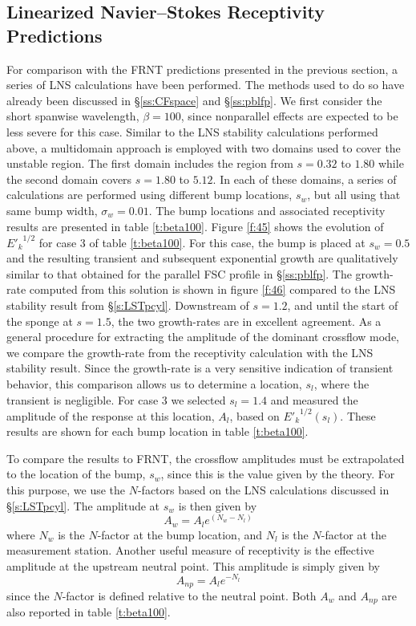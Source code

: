 \subsection{Linearized Navier--Stokes Receptivity Predictions 
\label{ss:LNSpcyl} }

For comparison with the FRNT predictions presented in the previous section, a
series of LNS calculations have been performed.  The methods used to do so
have already been discussed in \S\ref{ss:CFspace} and \S\ref{ss:pblfp}.  We
first consider the short spanwise wavelength, $\beta=100$, since nonparallel
effects are expected to be less severe for this case.  Similar to the LNS
stability calculations performed above, a multidomain approach is employed
with two domains used to cover the unstable region.  The first domain includes
the region from $s=0.32$ to $1.80$ while the second domain covers $s=1.80$ to
$5.12$.  In each of these domains, a series of calculations are performed
using different bump locations, $s_w$, but all using that same bump width,
$\sigma_w = 0.01$.  The bump locations and associated receptivity results are
presented in table \ref{t:beta100}.  Figure \ref{f:45} shows the evolution of
${E'_k}^{1/2}$ for case 3 of table \ref{t:beta100}.  For this case, the bump
is placed at $s_w=0.5$ and the resulting transient and subsequent exponential
growth are qualitatively similar to that obtained for the parallel FSC profile
in \S\ref{ss:pblfp}.  The growth-rate computed from this solution is shown in
figure \ref{f:46} compared to the LNS stability result from \S\ref{s:LSTpcyl}.
Downstream of $s=1.2$, and until the start of the sponge at $s=1.5$, the two
growth-rates are in excellent agreement.  As a general procedure for
extracting the amplitude of the dominant crossflow mode, we compare the
growth-rate from the receptivity calculation with the LNS stability result.
Since the growth-rate is a very sensitive indication of transient behavior,
this comparison allows us to determine a location, $s_l$, where the transient
is negligible.  For case 3 we selected $s_l = 1.4$ and measured the amplitude
of the response at this location, $A_l$, based on ${E'_k}^{1/2}(s_l)$.  These
results are shown for each bump location in table \ref{t:beta100}.

To compare the results to FRNT, the crossflow amplitudes must be extrapolated
to the location of the bump, $s_w$, since this is the value given by the
theory.  For this purpose, we use the $N$-factors based on the LNS
calculations discussed in \S\ref{s:LSTpcyl}.  The amplitude at $s_w$ is then
given by
%
\begin{equation}
  A_w = A_l e^{(N_w - N_l)}
\end{equation}
%
where $N_w$ is the $N$-factor at the bump location, and $N_l$ is the
$N$-factor at the measurement station.  Another useful measure of receptivity
is the effective amplitude at the upstream neutral point.  This amplitude is
simply given by
%
\begin{equation}
  A_{np} = A_l e^{-N_l}
\end{equation}
%
since the $N$-factor is defined relative to the neutral point.  Both $A_w$ and
$A_{np}$ are also reported in table \ref{t:beta100}.

